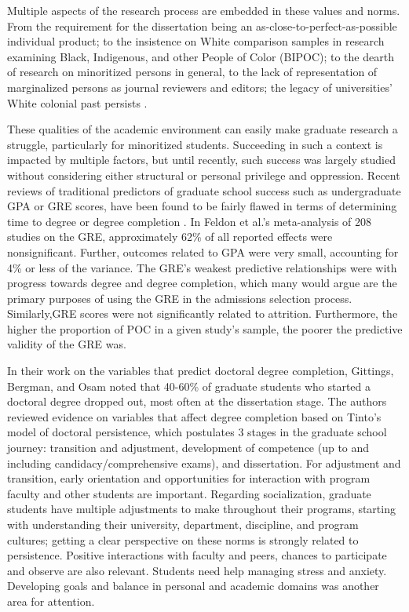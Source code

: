 \documentclass[
  11pt,
]{book}
\begin{document}
Multiple aspects of the research process are embedded in these values and norms. From the requirement for the dissertation being an as-close-to-perfect-as-possible individual product; to the insistence on White comparison samples in research examining Black, Indigenous, and other People of Color (BIPOC); to the dearth of research on minoritized persons in general, to the lack of representation of marginalized persons as journal reviewers and editors; the legacy of universities' White colonial past persists \citep{buchanan_upending_2021}.

These qualities of the academic environment can easily make graduate research a struggle, particularly for minoritized students. Succeeding in such a context is impacted by multiple factors, but until recently, such success was largely studied without considering either structural or personal privilege and oppression. Recent reviews of traditional predictors of graduate school success such as undergraduate GPA or GRE scores, have been found to be fairly flawed in terms of determining time to degree or degree completion \citep{feldon_predictive_2024, kurysheva_once_2022}. In Feldon et al.'s meta-analysis of 208 studies on the GRE, approximately 62\% of all reported effects were nonsignificant. Further, outcomes related to GPA were very small, accounting for 4\% or less of the variance. The GRE's weakest predictive relationships were with progress towards degree and degree completion, which many would argue are the primary purposes of using the GRE in the admissions selection process. Similarly,GRE scores were not significantly related to attrition. Furthermore, the higher the proportion of POC in a given study's sample, the poorer the predictive validity of the GRE was.

In their work on the variables that predict doctoral degree completion, Gittings, Bergman, and Osam \citeyearpar{gittings_doctoral_2018} noted that 40-60\% of graduate students who started a doctoral degree dropped out, most often at the dissertation stage. The authors reviewed evidence on variables that affect degree completion based on Tinto's \citeyearpar{tinto_leaving_1994} model of doctoral persistence, which postulates 3 stages in the graduate school journey: transition and adjustment, development of competence (up to and including candidacy/comprehensive exams), and dissertation. For adjustment and transition, early orientation and opportunities for interaction with program faculty and other students are important. Regarding socialization, graduate students have multiple adjustments to make throughout their programs, starting with understanding their university, department, discipline, and program cultures; getting a clear perspective on these norms is strongly related to persistence. Positive interactions with faculty and peers, chances to participate and observe are also relevant. Students need help managing stress and anxiety. Developing goals and balance in personal and academic domains was another area for attention.
\end{document}
